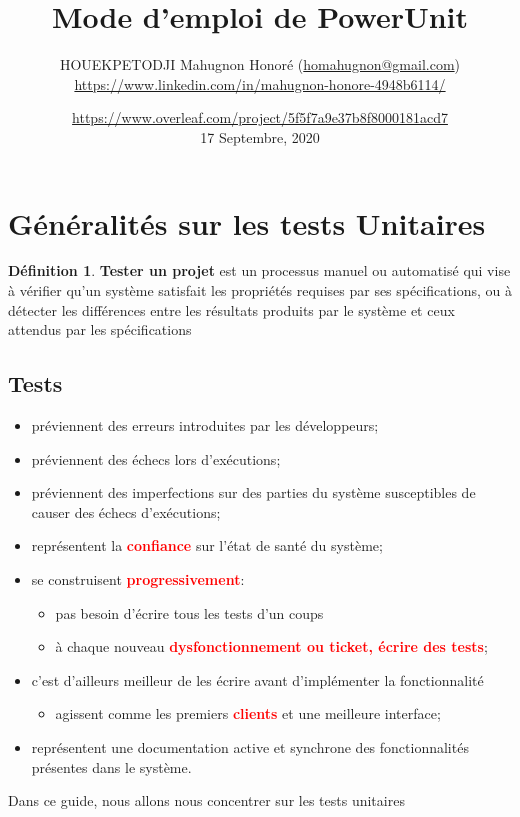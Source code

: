 \documentclass[french]{article}
\title{Mode d'emploi de PowerUnit}
\author{HOUEKPETODJI Mahugnon Honoré (\url{homahugnon@gmail.com})\\\url{https://www.linkedin.com/in/mahugnon-honore-4948b6114/}}
\date{\url{https://www.overleaf.com/project/5f5f7a9e37b8f8000181acd7}\\17 Septembre, 2020}
\theoremstyle{definition}
\newtheorem{definition}{Définition}[section]
\begin{document}
\maketitle



\tableofcontents
\newpage
\listoffigures
\clearpage

\section{Généralités sur les tests Unitaires}

\theoremstyle{definition}
\begin{definition}{\textbf{Tester un projet}}
 est un processus manuel ou automatisé qui vise à vérifier qu'un système satisfait les propriétés requises par ses spécifications, ou à détecter les différences entre les résultats produits par le système et ceux attendus par les spécifications
\end{definition}
\subsection{Tests}
\begin{itemize}
    \item préviennent des erreurs introduites par les développeurs;
    \item préviennent des échecs lors d'exécutions;
    \item préviennent des imperfections sur des parties du système susceptibles de causer des échecs d'exécutions;
    \item représentent la \textbf{\textcolor{red}{confiance}} sur l'état de santé du système;
    \item se construisent \textbf{\textcolor{red}{progressivement}}:
    \begin{itemize}
        \item pas besoin d'écrire tous les tests d'un coups
        \item à chaque nouveau  \textbf{\textcolor{red}{dysfonctionnement ou ticket, écrire des tests}};
    \end{itemize}
    \item c'est d'ailleurs meilleur de les écrire avant d'implémenter la fonctionnalité 
    \begin{itemize}
        \item agissent comme les premiers \textbf{\textcolor{red}{clients}} et une meilleure interface; 
    \end{itemize}
    \item représentent une documentation active et synchrone des fonctionnalités présentes dans le système.
    
\end{itemize}
Dans ce guide, nous allons nous concentrer sur les tests unitaires
\end{document}
